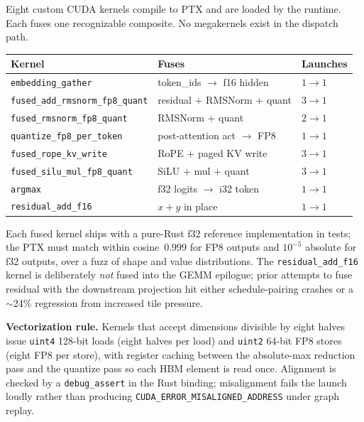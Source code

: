Eight custom CUDA kernels compile to PTX and are loaded by the runtime.
Each fuses one recognizable composite. No megakernels exist in the
dispatch path.

\begin{tabular}{lll}
\toprule
\textbf{Kernel} & \textbf{Fuses} & \textbf{Launches} \\
\midrule
\texttt{embedding\_gather}             & token\_ids $\to$ f16 hidden & $1\to 1$ \\
\texttt{fused\_add\_rmsnorm\_fp8\_quant} & residual + RMSNorm + quant & $3\to 1$ \\
\texttt{fused\_rmsnorm\_fp8\_quant}      & RMSNorm + quant            & $2\to 1$ \\
\texttt{quantize\_fp8\_per\_token}       & post-attention act $\to$ FP8 & $1\to 1$ \\
\texttt{fused\_rope\_kv\_write}         & RoPE + paged KV write      & $3\to 1$ \\
\texttt{fused\_silu\_mul\_fp8\_quant}    & SiLU + mul + quant         & $3\to 1$ \\
\texttt{argmax}                         & f32 logits $\to$ i32 token & $1\to 1$ \\
\texttt{residual\_add\_f16}             & $x + y$ in place           & $1\to 1$ \\
\bottomrule
\end{tabular}

Each fused kernel ships with a pure-Rust f32 reference implementation
in tests; the PTX must match within cosine~$0.999$ for FP8 outputs and
$10^{-5}$ absolute for f32 outputs, over a fuzz of shape and value
distributions. The \texttt{residual\_add\_f16} kernel is deliberately
\emph{not} fused into the GEMM epilogue; prior attempts to fuse residual
with the downstream projection hit either schedule-pairing crashes or a
$\sim$24\% regression from increased tile pressure.

\textbf{Vectorization rule.} Kernels that accept dimensions divisible by
eight halves issue \texttt{uint4} 128-bit loads (eight halves per load)
and \texttt{uint2} 64-bit FP8 stores (eight FP8 per store), with register
caching between the absolute-max reduction pass and the quantize pass so
each HBM element is read once. Alignment is checked by a
\texttt{debug\_assert} in the Rust binding; misalignment fails the launch
loudly rather than producing
\texttt{CUDA\_ERROR\_MISALIGNED\_ADDRESS} under graph replay.

